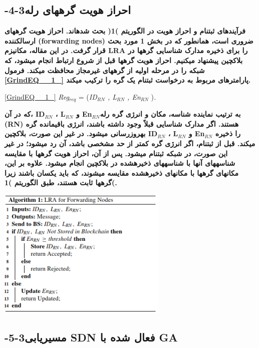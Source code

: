 \documentclass{article} %
\begin{document}
\noindent 
\subsection{ -4-3احراز هویت گرههای رله}

\noindent 
{\bf فرآیندهای ثبتنام و احراز هویت در الگوریتم )1( بحث شدهاند. احراز هویت گرههای ارسالکننده (forwarding nodes) ضروری است، همانطور که در بخش 1 مورد بحث قرار گرفت. در این مقاله، مکانیزم LRA را برای ذخیره مدارک شناسایی گرهها در بلاکچین پیشنهاد میکنیم. احراز هویت گرهها قبل از شروع ارتباط انجام میشود، که شبکه را در مرحله اولیه از گرههای غیرمجاز محافظت میکند. فرمول \eqref{GrindEQ__1_} پارامترهای مربوط به درخواست ثبتنام یک گره را ترکیب میکند.}

\noindent \eqref{GrindEQ__1_} \textit{Reg${}_{req}$ }= (\textit{ID${}_{RN}$ , L${}_{RN}$ , En${}_{RN}$ })\textit{. }

\noindent 
{\bf که در آن، ID${}_{RN}$ ، L${}_{RN}$ و  En${}_{RN}$به ترتیب نماینده شناسه، مکان و انرژی گره رله (RN) هستند. اگر مدارک شناسایی قبلاً وجود داشته باشند، انرژی باقیمانده گره بهروزرسانی میشود. در غیر این صورت، بلاکچین ID${}_{RN}$ ، L${}_{RN}$ و En${}_{RN}$ را ذخیره میکند. قبل از ثبتنام، اگر انرژی گره کمتر از حد مشخصی باشد، آن رد میشود؛ در غیر این صورت، در شبکه ثبتنام میشود. پس از آن، احراز هویت گرهها با مقایسه شناسههای آنها با شناسههای ذخیرهشده در بلاکچین انجام میشود. علاوه بر این، مکانهای گرهها با مکانهای ذخیرهشده مقایسه میشوند، که باید یکسان باشند زیرا گرهها ثابت هستند، طبق الگوریتم )1(.}

\noindent 
{\bf \includegraphics*[width=3.20in, height=2.46in]{image6}}

\noindent 
\subsection{ -5-3مسیریابی SDN فعال شده با GA}
\end{document}
